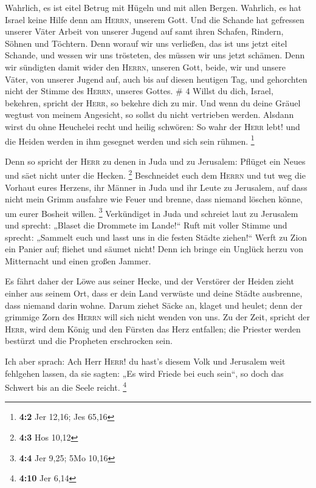  Wahrlich, es ist eitel Betrug mit Hügeln und mit allen
Bergen. Wahrlich, es hat Israel keine Hilfe denn am \textsc{Herrn},
unserem Gott.  Und die Schande hat gefressen unserer
Väter Arbeit von unserer Jugend auf samt ihren Schafen, Rindern, Söhnen
und Töchtern.  Denn worauf wir uns verließen, das ist uns
jetzt eitel Schande, und wessen wir uns trösteten, des müssen wir uns
jetzt schämen. Denn wir sündigten damit wider den \textsc{Herrn},
unseren Gott, beide, wir und unsere Väter, von unserer Jugend auf, auch
bis auf diesen heutigen Tag, und gehorchten nicht der Stimme des
\textsc{Herrn}, unseres Gottes. \# 4  Willst du dich,
Israel, bekehren, spricht der \textsc{Herr}, so bekehre dich zu mir. Und
wenn du deine Gräuel wegtust von meinem Angesicht, so sollst du nicht
vertrieben werden.  Alsdann wirst du ohne Heuchelei recht
und heilig schwören: So wahr der \textsc{Herr} lebt! und die Heiden
werden in ihm gesegnet werden und sich sein rühmen. \footnote{\textbf{4:2}
  Jer 12,16; Jes 65,16}

 Denn so spricht der \textsc{Herr} zu denen in Juda und zu
Jerusalem: Pflüget ein Neues und säet nicht unter die Hecken.
\footnote{\textbf{4:3} Hos 10,12}  Beschneidet euch dem
\textsc{Herrn} und tut weg die Vorhaut eures Herzens, ihr Männer in Juda
und ihr Leute zu Jerusalem, auf dass nicht mein Grimm ausfahre wie Feuer
und brenne, dass niemand löschen könne, um eurer Bosheit willen.
\footnote{\textbf{4:4} Jer 9,25; 5Mo 10,16}  Verkündiget
in Juda und schreiet laut zu Jerusalem und sprecht: „Blaset die Drommete
im Lande!{}`` Ruft mit voller Stimme und sprecht: „Sammelt euch und
lasst uns in die festen Städte ziehen!{}``  Werft zu Zion
ein Panier auf; fliehet und säumet nicht! Denn ich bringe ein Unglück
herzu von Mitternacht und einen großen Jammer.

 Es fährt daher der Löwe aus seiner Hecke, und der
Verstörer der Heiden zieht einher aus seinem Ort, dass er dein Land
verwüste und deine Städte ausbrenne, dass niemand darin wohne.
 Darum ziehet Säcke an, klaget und heulet; denn der
grimmige Zorn des \textsc{Herrn} will sich nicht wenden von uns.
 Zu der Zeit, spricht der \textsc{Herr}, wird dem König
und den Fürsten das Herz entfallen; die Priester werden bestürzt und die
Propheten erschrocken sein.

 Ich aber sprach: Ach Herr \textsc{Herr}! du hast's
diesem Volk und Jerusalem weit fehlgehen lassen, da sie sagten: „Es wird
Friede bei euch sein``, so doch das Schwert bis an die Seele reicht.
\footnote{\textbf{4:10} Jer 6,14}

